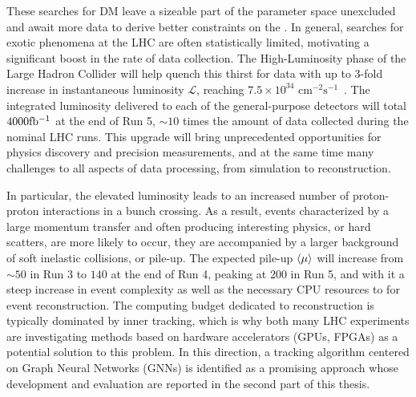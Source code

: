 These searches for DM leave a sizeable part of the parameter space unexcluded and await more data to derive better constraints on the \thdma. 
In general, searches for exotic phenomena at the LHC are often statistically limited, motivating a significant boost in the rate of data collection. 
The High-Luminosity phase of the Large Hadron Collider will help quench this thirst for data with up to 3-fold increase in instantaneous luminosity $\mathcal{L}$, reaching $7.5\times 10^{34}$ $\mathrm{cm}^{-2}\mathrm{s^{-1}}$~\cite{Aberle:2749422}.
The integrated luminosity delivered to each of the general-purpose detectors will total $4000\mbox{fb\(^{-1}\)}$ at the end of Run 5, $\sim 10$ times the amount of data collected during the nominal LHC runs. 
This upgrade will bring unprecedented opportunities for physics discovery and precision measurements, and at the same time many challenges to all aspects of data processing, from simulation to reconstruction. 

In particular, the elevated luminosity leads to an increased number of proton-proton interactions in a bunch crossing.
As a result, events characterized by a large momentum transfer and often producing interesting physics, or hard scatters, are more likely to occur, they are accompanied by a larger background of soft inelastic collisions, or pile-up. 
The expected pile-up $\expval{\mu}$ will increase from $\sim50$ in Run 3 to $140$ at the end of Run 4, peaking at 200 in Run 5, and with it a steep increase in event complexity as well as the necessary CPU resources to for event reconstruction.
The computing budget dedicated to reconstruction is typically dominated by inner tracking, which is why both many LHC experiments are investigating methods based on hardware accelerators (GPUs, FPGAs) as a potential solution to this problem. 
In this direction, a tracking algorithm centered on Graph Neural Networks (GNNs) is identified as a promising approach whose development and evaluation are reported in the second part of this thesis. 


